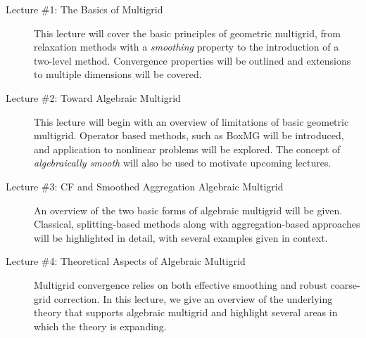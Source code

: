 \documentclass[article,letterpaper,11pt,oldfontcommands]{memoir}
\begin{document}
\vspace{-0.5cm}

\begin{description}
  \item[Lecture \#1: The Basics of Multigrid]
    This lecture will cover the basic principles of geometric multigrid, from
    relaxation methods with a \textit{smoothing} property to the introduction
    of a two-level method.  Convergence properties will be outlined and extensions
    to multiple dimensions will be covered.

  \item[Lecture \#2: Toward Algebraic Multigrid]
    This lecture will begin with an overview of limitations of basic geometric multigrid.
    Operator based methods, such as BoxMG will be introduced, and application to nonlinear
    problems will be explored.  The concept of \textit{algebraically smooth} will also be
    used to motivate upcoming lectures.

  \item[Lecture \#3: CF and Smoothed Aggregation Algebraic Multigrid]
    An overview of the two basic forms of algebraic multigrid will be given.
    Classical, splitting-based methods along with aggregation-based approaches
    will be highlighted in detail, with several examples given in context.

  \item[Lecture \#4: Theoretical Aspects of Algebraic Multigrid]
    Multigrid convergence relies on both effective smoothing and robust coarse-grid correction.
    In this lecture, we give an overview of the underlying theory that supports algebraic multigrid
    and highlight several areas in which the theory is expanding.
\end{description}
\end{document}
